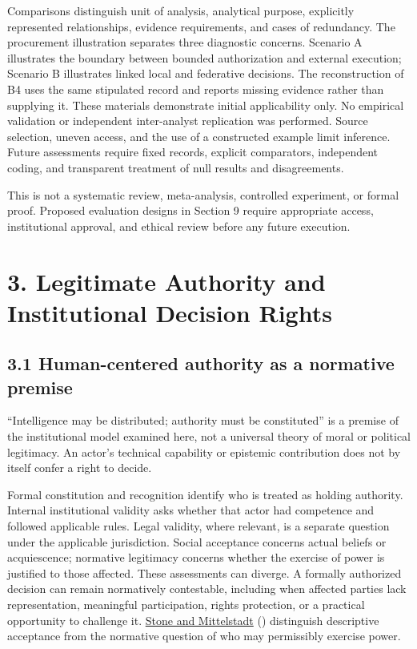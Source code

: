 \documentclass[
  10pt,
]{article}
\newcommand{\axCitet}[2]{\hyperlink{cite.#1}{#2} (\citeyear{#1})}
\begin{document}
Comparisons distinguish unit of analysis, analytical purpose, explicitly
represented relationships, evidence requirements, and cases of
redundancy. The procurement illustration separates three diagnostic
concerns. Scenario A illustrates the boundary between bounded
authorization and external execution; Scenario B illustrates linked
local and federative decisions. The reconstruction of B4 uses the same
stipulated record and reports missing evidence rather than supplying it.
These materials demonstrate initial applicability only. No empirical
validation or independent inter-analyst replication was performed.
Source selection, uneven access, and the use of a constructed example
limit inference. Future assessments require fixed records, explicit
comparators, independent coding, and transparent treatment of null
results and disagreements.

This is not a systematic review, meta-analysis, controlled experiment,
or formal proof. Proposed evaluation designs in Section 9 require
appropriate access, institutional approval, and ethical review before
any future execution.

\section{3. Legitimate Authority and Institutional Decision
Rights}\label{legitimate-authority-and-institutional-decision-rights}

\subsection{3.1 Human-centered authority as a normative
premise}\label{human-centered-authority-as-a-normative-premise}

``Intelligence may be distributed; authority must be constituted'' is a
premise of the institutional model examined here, not a universal theory
of moral or political legitimacy. An actor's technical capability or
epistemic contribution does not by itself confer a right to decide.

Formal constitution and recognition identify who is treated as holding
authority. Internal institutional validity asks whether that actor had
competence and followed applicable rules. Legal validity, where
relevant, is a separate question under the applicable jurisdiction.
Social acceptance concerns actual beliefs or acquiescence; normative
legitimacy concerns whether the exercise of power is justified to those
affected. These assessments can diverge. A formally authorized decision
can remain normatively contestable, including when affected parties lack
representation, meaningful participation, rights protection, or a
practical opportunity to challenge it. \axCitet{stone2026legitimate}{Stone and Mittelstadt}
distinguish descriptive acceptance from the normative question of who
may permissibly exercise power.
\end{document}
